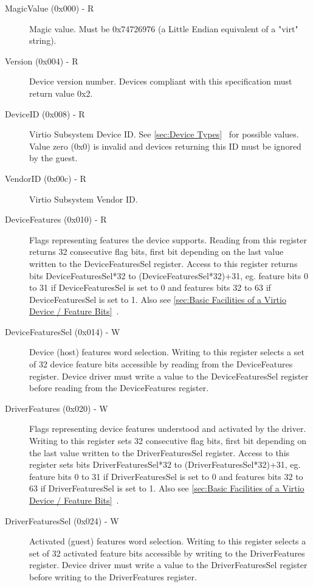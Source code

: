 \begin{description}
\item[MagicValue (0x000) - R]
  Magic value. Must be 0x74726976 (a Little Endian equivalent
  of a "virt" string).
\item[Version (0x004) - R]
  Device version number. Devices compliant with this specification
  must return value 0x2.
\item[DeviceID (0x008) - R]
  Virtio Subsystem Device ID.
  See \ref{sec:Device Types}~ for possible values. Value zero (0x0)
  is invalid and devices returning this ID must be ignored
  by the guest.
\item[VendorID (0x00c) - R]
  Virtio Subsystem Vendor ID.

\item[DeviceFeatures (0x010) - R]
  Flags representing features the device supports.
  Reading from this register returns 32 consecutive flag bits,
  first bit depending on the last value written to the
  DeviceFeaturesSel register. Access to this register returns
  bits DeviceFeaturesSel*32 to (DeviceFeaturesSel*32)+31, eg.
  feature bits 0 to 31 if DeviceFeaturesSel is set to 0 and
  features bits 32 to 63 if DeviceFeaturesSel is set to 1.
  Also see \ref{sec:Basic Facilities of a Virtio Device / Feature Bits}~.

\item[DeviceFeaturesSel (0x014) - W]
  Device (host) features word selection.
  Writing to this register selects a set of 32 device feature bits
  accessible by reading from the DeviceFeatures register. Device driver
  must write a value to the DeviceFeaturesSel register before
  reading from the DeviceFeatures register.

\item[DriverFeatures (0x020) - W]
  Flags representing device features understood and activated by
  the driver.
  Writing to this register sets 32 consecutive flag bits, first
  bit depending on the last value written to the DriverFeaturesSel
  register. Access to this register sets bits DriverFeaturesSel*32
  to (DriverFeaturesSel*32)+31, eg. feature bits 0 to 31 if
  DriverFeaturesSel is set to 0 and features bits 32 to 63 if
  DriverFeaturesSel is set to 1. Also see \ref{sec:Basic Facilities of a Virtio Device / Feature Bits}~.

\item[DriverFeaturesSel (0x024) - W]
  Activated (guest) features word selection.
  Writing to this register selects a set of 32 activated feature
  bits accessible by writing to the DriverFeatures register.
  Device driver must write a value to the DriverFeaturesSel
  register before writing to the DriverFeatures register.


\end{description}
